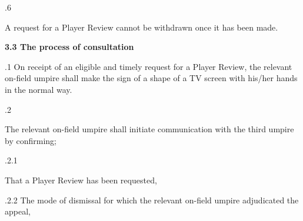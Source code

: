 \documentclass[12pt]{article}
\begin{document}
\vspace{\baselineskip}
{\fontsize{9pt}{10.8pt}.6 \tabto{0.49in} {\fontsize{8pt}{9.6pt}\selectfont A request for a Player Review cannot be withdrawn once it has been made.\par}\par}\par


\vspace{\baselineskip}
{\fontsize{11pt}{13.2pt}\selectfont \textbf{3.3 \tabto{0.47in} The process of consultation}\par}\par


\vspace{\baselineskip}
\begin{adjustwidth}{0.5in}{0.08in}
{\fontsize{9pt}{10.8pt}.1 \tabto{0.49in} On receipt of an eligible and timely request for a Player Review, the relevant on-field umpire shall make the sign of a shape of a TV screen with his/her hands in the normal way.\par}\par

\end{adjustwidth}


\vspace{\baselineskip}
{\fontsize{9pt}{10.8pt}.2 \tabto{0.49in} {\fontsize{8pt}{9.6pt}\selectfont The relevant on-field umpire shall initiate communication with the third umpire by confirming;\par}\par}\par


\vspace{\baselineskip}
\begin{adjustwidth}{0.49in}{0.0in}
{\fontsize{9pt}{10.8pt}.2.1 \tabto{1.17in} {\fontsize{8pt}{9.6pt}\selectfont That a Player Review has been requested,\par}\par}\par

\end{adjustwidth}


\vspace{\baselineskip}
\begin{adjustwidth}{0.49in}{0.0in}
{\fontsize{9pt}{10.8pt}.2.2 \tabto{1.17in} The mode of dismissal for which the relevant on-field umpire adjudicated the appeal,\par}\par

\end{adjustwidth}
\end{document}
